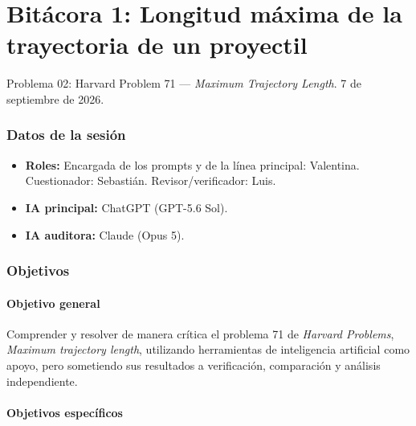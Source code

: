 
\part{Bitácora 1: Longitud máxima de la trayectoria de un proyectil}
\setcounter{section}{0}
\begin{center}\normalsize Problema 02: Harvard Problem 71 --- \textit{Maximum Trajectory Length}. 7 de septiembre de 2026.\end{center}


\section{Datos de la sesión}

\begin{itemize}
    \item \textbf{Roles:} Encargada de los prompts y de la línea principal: Valentina. Cuestionador: Sebastián. Revisor/verificador: Luis.

    \item \textbf{IA principal:} ChatGPT (GPT-5.6 Sol).

    \item \textbf{IA auditora:} Claude (Opus 5).
\end{itemize}


\section{Objetivos}

\subsection{Objetivo general}

Comprender y resolver de manera crítica el problema 71 de \textit{Harvard Problems}, \textit{Maximum trajectory length}, utilizando herramientas de inteligencia artificial como apoyo, pero sometiendo sus resultados a verificación, comparación y análisis independiente.

\subsection{Objetivos específicos}

